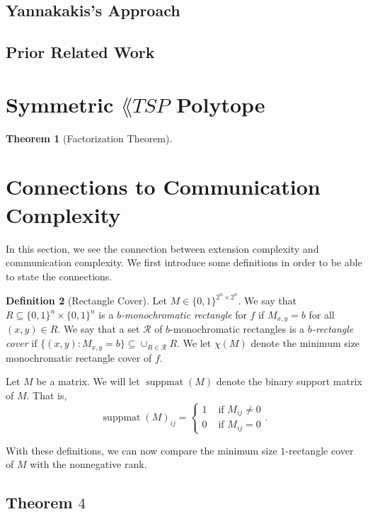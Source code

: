 \documentclass{article}
\newtheorem{theorem}{\sc Theorem}
\theoremstyle{definition}
\newtheorem{definition}[theorem]{Definition}
\theoremstyle{remark}
\newcommand{\bits}{\{0,1\}}
\newcommand{\suppmat}{\operatorname{suppmat}}
\begin{document}
\subsection{Yannakakis's Approach}
\label{sec:Yannakakis}

\subsection{Prior Related Work}


\section{Symmetric $\lang{TSP}$ Polytope}

\begin{theorem}[Factorization Theorem]\label{theor:factor}
\end{theorem}

\section{Connections to Communication Complexity}

In this section, we see the connection between extension complexity and communication complexity. We first introduce some definitions in order to be able to state the connections.

\begin{definition}[Rectangle Cover]
Let $M \in \bits^{2^n \times 2^n}$. We say that $R \subseteq \bits^n \times \bits^n$ is a \emph{$b$-monochromatic rectangle} for $f$ if $M_{x,y} = b$ for all $(x,y) \in R$. We say that a set $\mathcal{R}$ of $b$-monochromatic rectangles is a \emph{$b$-rectangle cover} if $\{(x,y) : M_{x,y} = b\} \subseteq \cup_{R \in \mathcal{R}} R$.  We let $\chi(M)$ denote the minimum size monochromatic rectangle cover of $f$.
\end{definition}

Let $M$ be a matrix. We will let $\suppmat(M)$ denote the binary support matrix of $M$. That is, 
\[
\suppmat(M)_{ij} = \begin{cases}
1 & \text{ if } M_{ij} \ne 0 \\
0 & \text{ if } M_{ij} = 0
\end{cases}.
\]

With these definitions, we can now compare the minimum size $1$-rectangle cover of $M$ with the nonnegative rank.


\subsection{Theorem $4$}\label{sec:theorem4}
\end{document}
